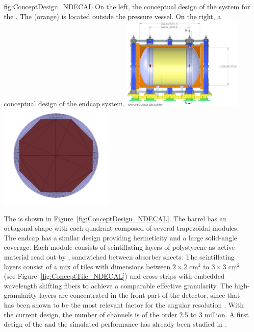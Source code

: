 \begin{dunefigure}{fig:ConceptDesign_NDECAL}
{On the left, the conceptual design of the  system for the . The  (orange) is located outside the  pressure vessel. On the right, a conceptual design of the  endcap system.}
\includegraphics[width=0.45\textwidth]{graphics/MPDdrawing.jpg}
\includegraphics[width=0.42\textwidth]{graphics/ECAL_Endcap_System.png}
\end{dunefigure}
The  is shown in Figure~\ref{fig:ConceptDesign_NDECAL}.  The barrel has an octagonal shape with each quadrant composed of several trapezoidal modules. The  endcap has a similar design providing hermeticity and a large solid-angle coverage. Each module consists of scintillating layers of polystyrene as active material read out by , sandwiched between absorber sheets. The scintillating layers consist of a mix of tiles with dimensions between $2\times2$ cm$^2$ to $3\times3$ cm$^2$ (see Figure~\ref{fig:ConceptTile_NDECAL}) and cross-strips with embedded wavelength shifting fibers to achieve a comparable effective granularity. The high-granularity layers are concentrated in the front part of the detector, since that has been shown to be the most relevant factor for the angular resolution \cite{Emberger:2018pgr}. With the current design, the number of channels is of the order 2.5 to 3 million. A first design of the  and the simulated performance has already been studied in \cite{Emberger:2018pgr}.

